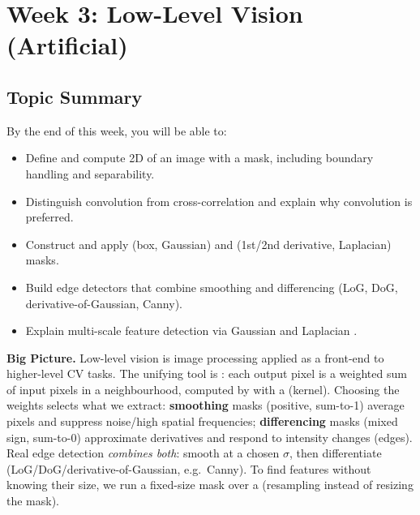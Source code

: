 \section{Week 3: Low-Level Vision (Artificial)}

\subsection{Topic Summary}

\begin{keybox}
By the end of this week, you will be able to:
\begin{itemize}
  \item Define and compute 2D  of an image with a mask, including boundary handling and separability.
  \item Distinguish convolution from cross-correlation and explain why convolution is preferred.
  \item Construct and apply  (box, Gaussian) and  (1st/2nd derivative, Laplacian) masks.
  \item Build edge detectors that combine smoothing and differencing (LoG, DoG, derivative-of-Gaussian, Canny).
  \item Explain multi-scale feature detection via Gaussian and Laplacian .
\end{itemize}
\end{keybox}

\textbf{Big Picture.}
Low-level vision is image processing applied as a front-end to higher-level CV tasks. The unifying tool is : each output pixel is a weighted sum of input pixels in a neighbourhood, computed by  with a  (kernel). Choosing the weights selects what we extract: \textbf{smoothing} masks (positive, sum-to-1) average pixels and suppress noise/high spatial frequencies; \textbf{differencing} masks (mixed sign, sum-to-0) approximate derivatives and respond to intensity changes (edges). Real edge detection \emph{combines both}: smooth at a chosen  $\sigma$, then differentiate (LoG/DoG/derivative-of-Gaussian, e.g.\ Canny). To find features without knowing their size, we run a fixed-size mask over a  (resampling instead of resizing the mask).

